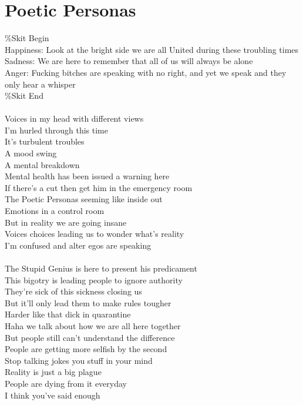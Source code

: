 \documentclass[12pt, b5paper, oneside]{book}
\begin{document}
\section{Poetic Personas}
\%Skit Begin
\\Happiness: Look at the bright side we are all United during these troubling times
%
\\Sadness: We are here to remember that all of us will always be alone
%
\\Anger: Fucking bitches are speaking with no right, and yet we speak and they only hear a whisper
\\\%Skit End
%
\\\\Voices in my head with different views
\\I'm hurled through this time
\\It's turbulent troubles
\\A mood swing
\\A mental breakdown
\\Mental health has been issued a warning here
\\If there's a cut then get him in the emergency room
\\The Poetic Personas seeming like inside out
\\Emotions in a control room
\\But in reality we are going insane
\\Voices choices leading us to wonder what's reality
\\I'm confused and alter egos are speaking
%
\\\\The Stupid Genius is here to present his predicament
\\This bigotry is leading people to ignore authority
\\They're sick of this sickness closing us
\\But it'll only lead them to make rules tougher
\\Harder like that dick in quarantine
\\Haha we talk about how we are all here together
\\But people still can't understand the difference
\\People are getting more selfish by the second
\\Stop talking jokes you stuff in your mind
\\Reality is just a big plague
\\People are dying from it everyday
%
\\I think you've said enough
\end{document}
